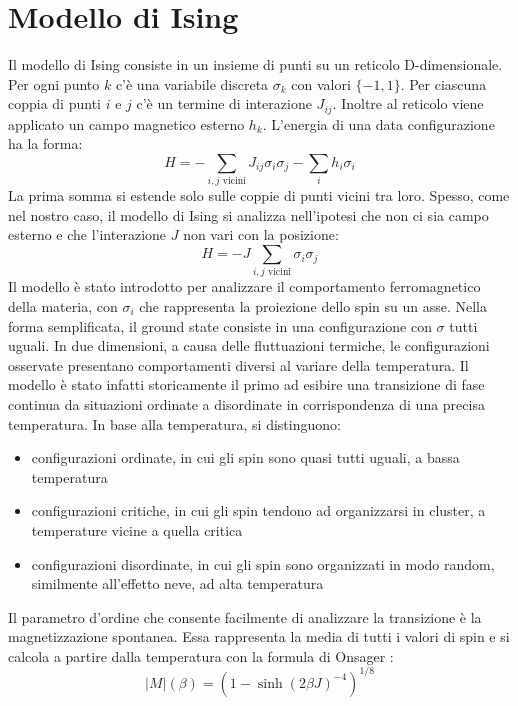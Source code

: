 \documentclass[a4paper]{article}
\begin{document}
\section{Modello di Ising}
Il modello di Ising consiste in un insieme di punti su un reticolo D-dimensionale. Per ogni punto $k$ c'è una variabile discreta $\sigma_k$ con valori $\lbrace-1, 1\rbrace$. Per ciascuna coppia di punti $i$ e $j$ c'è un termine di interazione $J_{ij}$. Inoltre al reticolo viene applicato un campo magnetico esterno $h_{k}$. L'energia di una data configurazione ha la forma:
\begin{equation}
H = - \sum_{i,j \text{ vicini}} J_{ij} \sigma_i \sigma_j - \sum_i h_i \sigma_i
\end{equation}
La prima somma si estende solo sulle coppie di punti vicini tra loro. Spesso, come nel nostro caso, il modello di Ising si analizza nell'ipotesi che non ci sia campo esterno e che l'interazione $J$ non vari con la posizione:
\begin{equation}
H = -J \sum_{i,j \text{ vicini}}  \sigma_i \sigma_j
\end{equation}
Il modello è stato introdotto per analizzare il comportamento ferromagnetico della materia, con $\sigma_{i}$ che rappresenta la proiezione dello spin su un asse. Nella forma semplificata, il ground state consiste in una configurazione con $\sigma$ tutti uguali. In due dimensioni, a causa delle fluttuazioni termiche, le configurazioni osservate presentano comportamenti diversi al variare della temperatura. Il modello è stato infatti storicamente il primo ad esibire una transizione di fase continua da situazioni ordinate a disordinate in corrispondenza di una precisa temperatura.
In base alla temperatura, si distinguono:
\begin{itemize}
\item configurazioni ordinate, in cui gli spin sono quasi tutti uguali, a bassa temperatura
\item configurazioni critiche, in cui gli spin tendono ad organizzarsi in cluster, a temperature vicine a quella critica
\item configurazioni disordinate, in cui gli spin sono organizzati in modo random, similmente all'effetto neve, ad alta temperatura
\end{itemize}
Il parametro d'ordine che consente facilmente di analizzare la transizione è la magnetizzazione spontanea. Essa rappresenta la media di tutti i valori di spin e si calcola a partire dalla temperatura con la formula di Onsager \cite{onsager}:
\begin{equation}
|M|(\beta) = (1-\sinh(2\beta J)^{-4})^{1/8}
\end{equation}
\end{document}
